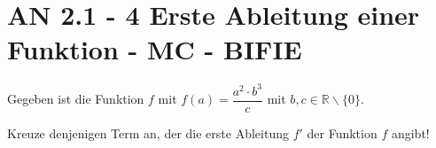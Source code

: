 \section{AN 2.1 - 4 Erste Ableitung einer Funktion - MC - BIFIE}

\begin{beispiel}[AN 2.1]{1} %
				Gegeben ist die Funktion $f$ mit $f(a)=\dfrac{a^2\cdot b^3}{c}$ mit $b,c\in\mathbb{R}\backslash\{0\}$.

Kreuze denjenigen Term an, der die erste Ableitung $f'$ der Funktion $f$ angibt!

\end{beispiel}